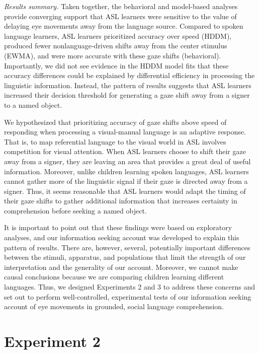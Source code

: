 \documentclass[english,floatsintext,man]{apa6}
\begin{document}
\emph{Results summary.} Taken together, the behavioral and model-based
analyses provide converging support that ASL learners were sensitive to
the value of delaying eye movements away from the language source.
Compared to spoken language learners, ASL learners prioritized accuracy
over speed (HDDM), produced fewer nonlanguage-driven shifts away from
the center stimulus (EWMA), and were more accurate with these gaze
shifts (behavioral). Importantly, we did not see evidence in the HDDM
model fits that these accuracy differences could be explained by
differential efficiency in processing the linguistic information.
Instead, the pattern of results suggests that ASL learners increased
their decision threshold for generating a gaze shift away from a signer
to a named object.

We hypothesized that prioritizing accuracy of gaze shifts above speed of
responding when processing a visual-manual language is an adaptive
response. That is, to map referential language to the visual world in
ASL involves competition for visual attention. When ASL learners choose
to shift their gaze away from a signer, they are leaving an area that
provides a great deal of useful information. Moreover, unlike children
learning spoken languages, ASL learners cannot gather more of the
linguistic signal if their gaze is directed away from a signer. Thus, it
seems reasonable that ASL learners would adapt the timing of their gaze
shifts to gather additional information that increases certainty in
comprehension before seeking a named object.

It is important to point out that these findings were based on
exploratory analyses, and our information seeking account was developed
to explain this pattern of results. There are, however, several,
potentially important differences between the stimuli, apparatus, and
populations that limit the strength of our interpretation and the
generality of our account. Moreover, we cannot make causal conclusions
because we are comparing children learning different languages. Thus, we
designed Experiments 2 and 3 to address these concerns and set out to
perform well-controlled, experimental tests of our information seeking
account of eye movements in grounded, social language comprehension.

\hypertarget{experiment-2}{%
\section{Experiment 2}\label{experiment-2}}
\end{document}
